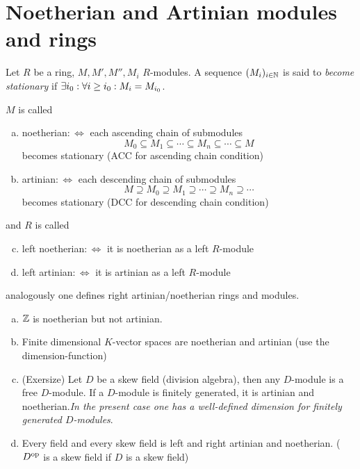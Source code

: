 \documentclass[a4paper]{report}
\begin{document}
\section{Noetherian and Artinian modules and rings}

Let $R$ be a ring, $M, M', M'', M_i$ $R$-modules. A sequence $(M_{i})_{i \in \mathbb{N}}$ is said to \emph{become stationary} if $\exists i_{0} : \forall i \ge i_{0} : M_{i} = M_{i_{0}}$.
\begin{defi}
  $M$ is called
  \begin{enumerate}[(a)]
    \item noetherian$:\iff$ each ascending chain of submodules \[M_{0} \subseteq M_{1} \subseteq \cdots \subseteq M_{n} \subseteq \cdots \subseteq M\] becomes stationary (ACC for ascending chain condition)
    \item artinian$:\iff$ each descending chain of submodules \[M \supseteq M_0 \supseteq M_{1} \supseteq \cdots \supseteq M_{n} \supseteq \cdots\] becomes stationary (DCC for descending chain condition)
  \end{enumerate}
  and $R$ is called
  \begin{enumerate}[(a)]
          \setcounter{enumi}{2}
    \item left noetherian$:\iff$ it is noetherian as a left $R$-module
    \item left artinian$:\iff$ it is artinian as a left $R$-module
  \end{enumerate}
  analogously one defines right artinian/noetherian rings and modules.
\end{defi}

\begin{exmps}
  \begin{enumerate}[(a)]
    \item $\mathbb{Z}$ is noetherian but not artinian.
    \item Finite dimensional $K$-vector spaces are noetherian and artinian (use the dimension-function)
    \item (Exersize) Let $D$ be a skew field (division algebra), then any $D$-module is a free $D$-module. If a $D$-module is finitely generated, it is artinian and noetherian.\emph{In the present case one has a well-defined dimension for finitely generated $D$-modules}.
          \item Every field and every skew field is left and right artinian and noetherian. ($D^\text{op}$ is a skew field if $D$ is a skew field)
  \end{enumerate}
\end{exmps}
\end{document}
